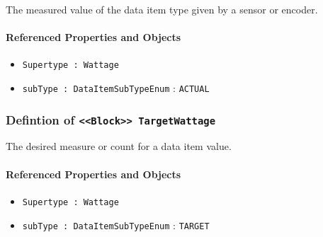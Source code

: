 \FloatBarrier

The measured value of the data item type given by a sensor or encoder.

\FloatBarrier
\paragraph{Referenced Properties and Objects}

\begin{itemize}
\item \texttt{Supertype : Wattage}

\item \texttt{subType : DataItemSubTypeEnum} : \texttt{ACTUAL}

\end{itemize}
\FloatBarrier
\subsubsection{Defintion of \texttt{<<Block>> TargetWattage}}
  \label{type:TargetWattage}

\FloatBarrier

The desired measure or count for a data item value.

\FloatBarrier
\paragraph{Referenced Properties and Objects}

\begin{itemize}
\item \texttt{Supertype : Wattage}

\item \texttt{subType : DataItemSubTypeEnum} : \texttt{TARGET}

\end{itemize}
\FloatBarrier
